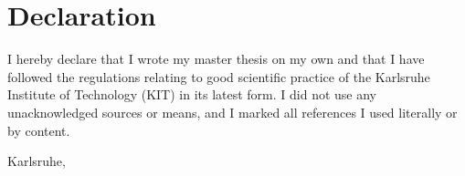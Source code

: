 \chapter*{Declaration}
\vspace*{3.0em}

I hereby declare that I wrote my master thesis on my own and that I have followed the regulations relating to good scientific practice of the Karlsruhe Institute of Technology (KIT) in its latest form. I did not use any unacknowledged sources or means, and I marked all references I used literally or by content.


\vspace*{2.0em}
\noindent Karlsruhe, \thesistimehandin

\vspace*{5.0em}
\noindent \thesisauthor

\cleardoublepage
